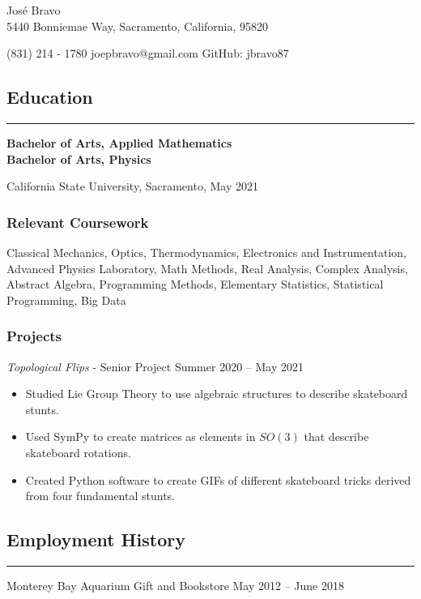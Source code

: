 \documentclass[letterpaper, 10 pt]{article}
\begin{document}
\begin{center}
\huge Jos\'e Bravo \\
\normalsize 5440 Bonniemae Way, Sacramento, California, 95820
\end{center}
\centerline{(831) 214 - 1780 \vrule \; joepbravo@gmail.com \vrule \; GitHub: jbravo87} 
\subsection*{Education}
\noindent\rule[0.75ex]{\linewidth}{1 pt}
\textbf{Bachelor of Arts, Applied Mathematics} \\
\textbf{Bachelor of Arts, Physics}

California State University, Sacramento, May 2021 %
\subsubsection*{Relevant Coursework}
\quad Classical Mechanics, Optics, Thermodynamics, Electronics and Instrumentation, Advanced Physics Laboratory, Math Methods, Real Analysis, Complex Analysis, Abstract Algebra, Programming Methods, Elementary Statistics, Statistical Programming, Big Data %
\subsubsection*{Projects}
\centerline{\textit{Topological Flips} - Senior Project \hfill Summer 2020 – May 2021}
\begin{itemize}
\item Studied Lie Group Theory to use algebraic structures to describe skateboard stunts.
\item Used SymPy to create matrices as elements in $SO(3)$ that describe skateboard rotations.
\item Created Python software to create GIFs of different skateboard tricks derived from four fundamental stunts.
\end{itemize}
\subsection*{Employment History}
\noindent\rule[0.75ex]{\linewidth}{1 pt}
\centerline{Monterey Bay Aquarium Gift and Bookstore \hfill May 2012 – June 2018}
\end{document}
